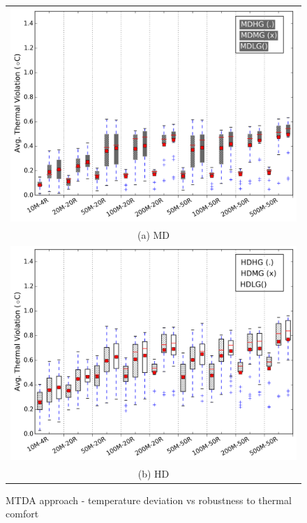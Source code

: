 \begin{figure}
\centering
\begin{tabular}{c}
  \includegraphics[width=0.9\linewidth]{figs/avg_thermal_violation_diff_temp_flex_def_vs_oarb_medium_boxplot_mtd.png} \\
(a) MD \\[6pt]
  \includegraphics[width=0.9\linewidth]{figs/avg_thermal_violation_diff_temp_flex_def_vs_oarb_high_boxplot_mtd.png} \\
(b) HD \\[6pt]	
\end{tabular}
\caption{MTDA approach - temperature deviation vs robustness to thermal comfort}
\label{fig:atc_mtrb}
\end{figure}

